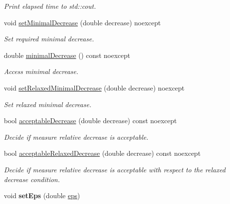 \begin{DoxyCompactItemize}
\begin{DoxyCompactList}\small\item\em Print elapsed time to std\+::cout. \end{DoxyCompactList}\item 
void \hyperlink{classSpacy_1_1Mixin_1_1DecreaseCondition_aeebecf3cbbbb6cd2631abe7fd3888aad}{set\+Minimal\+Decrease} (double decrease) noexcept
\begin{DoxyCompactList}\small\item\em Set required minimal decrease. \end{DoxyCompactList}\item 
double \hyperlink{classSpacy_1_1Mixin_1_1DecreaseCondition_a8e0fba73f86381f6c7479f1a0d524be6}{minimal\+Decrease} () const noexcept
\begin{DoxyCompactList}\small\item\em Access minimal decrease. \end{DoxyCompactList}\item 
void \hyperlink{classSpacy_1_1Mixin_1_1DecreaseCondition_a396bb6f45eb4533e07fa1d174d84ca9f}{set\+Relaxed\+Minimal\+Decrease} (double decrease) noexcept
\begin{DoxyCompactList}\small\item\em Set relaxed minimal decrease. \end{DoxyCompactList}\item 
bool \hyperlink{classSpacy_1_1Mixin_1_1DecreaseCondition_a11426318e1cc6d06b6251636d2a14389}{acceptable\+Decrease} (double decrease) const noexcept
\begin{DoxyCompactList}\small\item\em Decide if measure relative decrease is acceptable. \end{DoxyCompactList}\item 
bool \hyperlink{classSpacy_1_1Mixin_1_1DecreaseCondition_a343f1fa78010d07db49f36da46495ad5}{acceptable\+Relaxed\+Decrease} (double decrease) const noexcept
\begin{DoxyCompactList}\small\item\em Decide if measure relative decrease is acceptable with respect to the relaxed decrease condition. \end{DoxyCompactList}\item 
void {\bfseries set\+Eps} (double \hyperlink{classSpacy_1_1Mixin_1_1Eps_a40e2ba8f3abd2b5370ef41238cfaaf8b}{eps})\hypertarget{classSpacy_1_1Mixin_1_1Eps_a1bbfd62541610d5d80f2782ab77158e4}{}\label{classSpacy_1_1Mixin_1_1Eps_a1bbfd62541610d5d80f2782ab77158e4}


\end{DoxyCompactItemize}
